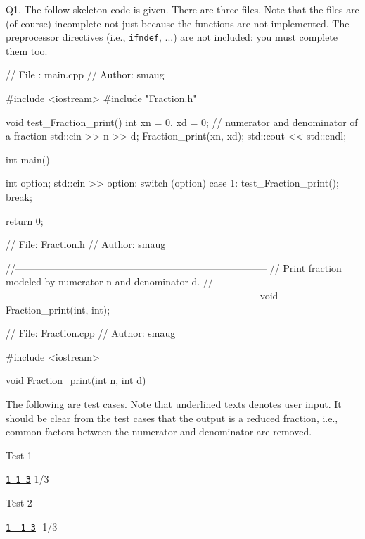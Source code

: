 Q1.
The follow skeleton code is given. There are three files.
Note that the files are (of course) incomplete not just because the
functions are not implemented.
The preprocessor directives (i.e., \verb!ifndef!, ...) are not included:
you must complete them too.

{\small
\begin{console}
// File  : main.cpp
// Author: smaug

#include <iostream>
#include "Fraction.h"

void test_Fraction_print()
{
    int xn = 0, xd = 0; // numerator and denominator of a fraction
    std::cin >> n >> d;
    Fraction_print(xn, xd);
    std::cout << std::endl;
}


int main()
{
    int option;
    std::cin >> option:
    switch (option)
    {
        case 1:
            test_Fraction_print();
            break;
    }
    
    return 0;
}
\end{console}
\begin{console}
// File: Fraction.h
// Author: smaug

//-----------------------------------------------------------------------------
// Print fraction modeled by numerator n and denominator d.
//-----------------------------------------------------------------------------
void Fraction_print(int, int);

\end{console}
\begin{console}
// File: Fraction.cpp
// Author: smaug

#include <iostream>


void Fraction_print(int n, int d)
{
}
\end{console}
}

The following are test cases. Note that underlined texts denotes
user input.
It should be clear from the test cases that the output
is a reduced fraction, i.e., common factors between the numerator
and denominator are removed.

Test 1
\begin{console}[commandchars=\\\{\}]
\underline{\texttt{1 1 3}}
1/3
\end{console}

Test 2
\begin{console}[commandchars=\\\{\}]
\underline{\texttt{1 -1 3}}
-1/3
\end{console}

